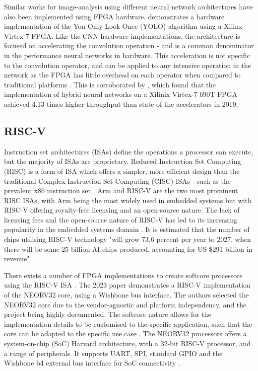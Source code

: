 Similar works for image-analysis using different neural network architectures have also been implemented using FPGA hardware.
\cite{Yolo, SparseYolo } demonstrates a hardware implementation of the You Only Look Once (YOLO) algorithm using a Xilinx Virtex-7 FPGA. 
Like the CNN hardware implementations, the architecture is focused on accelerating the convolution operation - and is a common denominator in the performance neural networks in hardware.
This acceleration is not specific to the convolution operator, and can be applied to any intensive operation in the network as the FPGA has little overhead on each operator when compared to traditional platforms \cite{Overhead}.
This is corroborated by \cite{Throughput}, which found that the implementation of hybrid neural networks on a Xilinix Virtex-7 690T FPGA achieved 4.13 times higher throughput than state of the accelerators in 2019.

\subsection{RISC-V}
Instruction set architectures (ISAs) define the operations a processor can execute, but the majority of ISAs are proprietary. 
Reduced Instruction Set Computing (RISC) is a form of ISA which offers a simpler, more efficient design than the traditional Complex Instruction Set Computing (CISC) ISAs - such as the prevalent x86 instruction set \cite{Arm}.
Arm and RISC-V are the two most prominent RISC ISAs, with Arm being the most widely used in embedded systems but with RISC-V offering royalty-free licensing and an open-source nature.
The lack of licensing fees and the open-source nature of RISC-V has led to its increasing popularity in the embedded systems domain \cite{Neutron}.
It is estimated that the number of chips utilising RISC-V technology "will grow 73.6 percent per year to 2027, when there will be some 25 billion AI chips produced, accounting for US \$291 billion in revenue" \cite{Drowsiness}.

There exists a number of FPGA implementations to create softcore processors using the RISC-V ISA \cite{RISCFPGA}. 
The 2023 paper \cite{Neutron} demonstrates a RISC-V implementation of the NEORV32 core, using a Wishbone bus interface. 
The authors selected the NEORV32 core due to the vendor-agnostic and platform independency, and the project being highly documented.
The softcore nature allows for the implementation details to be customised to the specific application, such that the core can be adapted to the specific use case \cite{DCT}. The NEORV32 processors offers a system-on-chip (SoC) Harvard architecture, with a 32-bit RISC-V processor, and a range of peripherals.
It supports UART, SPI, standard GPIO and the Wishbone b4 external bus interface for SoC connectivity \cite{NEORV32}.

